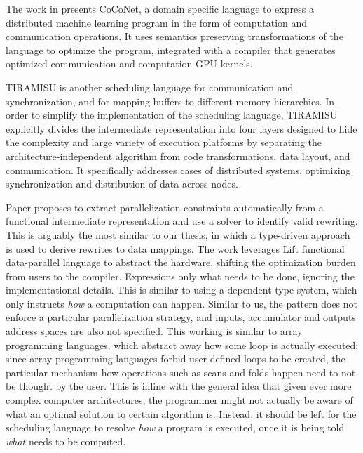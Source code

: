 \documentclass[10pt,a4paper]{article}
\begin{document}
The work in \cite{BreakingTheCoJangda2022} presents CoCoNet, a domain specific language to express a distributed machine learning program in the form of computation and communication operations.
It uses semantics preserving transformations of the language to optimize the program, integrated with a compiler that generates optimized communication and computation GPU kernels.

TIRAMISU \cite{TiramisuAPolBaghda2019} is another scheduling language for communication and synchronization, and for mapping buffers to different memory hierarchies.
In order to simplify the implementation of the scheduling language, TIRAMISU explicitly divides the intermediate representation into four layers designed to hide the complexity and large variety of execution platforms by separating the architecture-independent algorithm from code transformations, data layout, and communication.
It specifically addresses cases of distributed systems, optimizing synchronization and distribution of data across nodes.

Paper \cite{MappingParalleMogers2022} proposes to extract parallelization constraints automatically from a functional intermediate representation and use a solver to identify valid rewriting.
This is arguably the most similar to our thesis, in which a type-driven approach is used to derive rewrites to data mappings.
The work leverages Lift functional data-parallel language to abstract the hardware, shifting the optimization burden from users to the compiler. Expressions only what needs to be done, ignoring the implementational details.
This is similar to using a dependent type system, which only instructs \emph{how} a computation can happen.
Similar to us, the pattern does not enforce a particular parallelization strategy, and inputs, accumulator and outputs address spaces are also not specified.
This working is similar to array programming languages, which abstract away how some loop is actually executed: since array programming languages forbid user-defined loops to be created, the particular mechanism how operations such as scans and folds happen need to not be thought by the user.
This is inline with the general idea that given ever more complex computer architectures, the programmer might not actually be aware of what an optimal solution to certain algorithm is.
Instead, it should be left for the scheduling language to resolve \emph{how} a program is executed, once it is being told \emph{what} needs to be computed.
\end{document}
